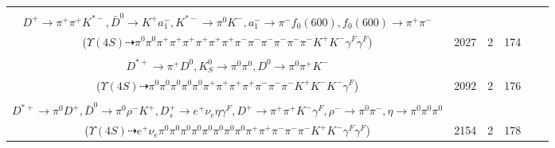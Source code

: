 \documentclass[landscape]{article}
\newcounter{rownumbers}
\newcommand\rn{\stepcounter{rownumbers}\arabic{rownumbers}}
\newcommand{\EOLP}{\\ \hline} %
\newcommand{\topoTags}[1]{#1} %
\begin{document}
\begin{longtable}{clcccc}
\rn & \makecell[l]{ $ 
\Upsilon(4S) \rightarrow B^{0} \bar{B}^{0} ,
B^{0} \rightarrow \rho^{0} \pi^{+} \pi^{+} \pi^{-} D^{*-} \gamma^{F} ,
\bar{B}^{0} \rightarrow \rho^{-} D^{+} ,
\rho^{0} \rightarrow \pi^{+} \pi^{-} \gamma^{F} ,
D^{*-} \rightarrow \pi^{-} \bar{D}^{0} ,
\rho^{-} \rightarrow \pi^{0} \pi^{-} ,
$ \\ $
D^{+} \rightarrow \pi^{+} \pi^{+} K^{*-} ,
\bar{D}^{0} \rightarrow K^{+} a_{1}^{-} ,
K^{*-} \rightarrow \pi^{0} K^{-} ,
a_{1}^{-} \rightarrow \pi^{-} f_{0}(600) ,
f_{0}(600) \rightarrow \pi^{+} \pi^{-} 
$ \\ ($
\Upsilon(4S) \dashrightarrow \pi^{0} \pi^{0} \pi^{+} \pi^{+} \pi^{+} \pi^{+} \pi^{+} \pi^{+} \pi^{-} \pi^{-} \pi^{-} \pi^{-} \pi^{-} \pi^{-} K^{+} K^{-} \gamma^{F} \gamma^{F} 
$) } & \topoTags{2027 & }2 & 174 \EOLP

\rn & \makecell[l]{ $ 
\Upsilon(4S) \rightarrow B^{0} \bar{B}^{0} ,
B^{0} \rightarrow K^{0} K^{+} K^{-} ,
\bar{B}^{0} \rightarrow \pi^{0} \rho^{0} \pi^{+} \pi^{-} \rho^{-} D^{*+} ,
K^{0} \rightarrow K_{S}^{0} ,
\rho^{0} \rightarrow \pi^{+} \pi^{-} \gamma^{F} ,
\rho^{-} \rightarrow \pi^{0} \pi^{-} ,
$ \\ $
D^{*+} \rightarrow \pi^{+} D^{0} ,
K_{S}^{0} \rightarrow \pi^{0} \pi^{0} ,
D^{0} \rightarrow \pi^{0} \pi^{+} K^{-} 
$ \\ ($
\Upsilon(4S) \dashrightarrow \pi^{0} \pi^{0} \pi^{0} \pi^{0} \pi^{0} \pi^{+} \pi^{+} \pi^{+} \pi^{+} \pi^{-} \pi^{-} \pi^{-} K^{+} K^{-} K^{-} \gamma^{F} 
$) } & \topoTags{2092 & }2 & 176 \EOLP

\rn & \makecell[l]{ $ 
\Upsilon(4S) \rightarrow B^{0} \bar{B}^{0} ,
B^{0} \rightarrow D^{*-} D_{s0}^{*+} ,
\bar{B}^{0} \rightarrow \rho^{-} D^{*+} ,
D^{*-} \rightarrow \pi^{-} \bar{D}^{0} ,
D_{s0}^{*+} \rightarrow \pi^{0} D_{s}^{+} ,
\rho^{-} \rightarrow \pi^{0} \pi^{-} ,
$ \\ $
D^{*+} \rightarrow \pi^{0} D^{+} ,
\bar{D}^{0} \rightarrow \pi^{0} \rho^{-} K^{+} ,
D_{s}^{+} \rightarrow e^{+} \nu_{e} \eta \gamma^{F} ,
D^{+} \rightarrow \pi^{+} \pi^{+} K^{-} \gamma^{F} ,
\rho^{-} \rightarrow \pi^{0} \pi^{-} ,
\eta \rightarrow \pi^{0} \pi^{0} \pi^{0} 
$ \\ ($
\Upsilon(4S) \dashrightarrow e^{+} \nu_{e} \pi^{0} \pi^{0} \pi^{0} \pi^{0} \pi^{0} \pi^{0} \pi^{0} \pi^{0} \pi^{+} \pi^{+} \pi^{-} \pi^{-} \pi^{-} K^{+} K^{-} \gamma^{F} \gamma^{F} 
$) } & \topoTags{2154 & }2 & 178 \EOLP


\end{longtable}
\end{document}

